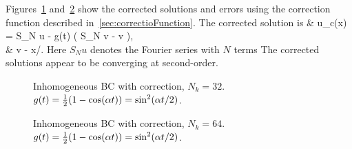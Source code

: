 Figures~\ref{fig:eveForcedBCCorrectedN32} and~\ref{fig:eveForcedBCCorrectedN64}
show the corrected solutions and errors using the correction function described in~\ref{sec:correctioFunction}.
The corrected solution is 
\ba
  & u_c(x) = S_N u - g(t) ( S_N v - v ), \\
  & v  - x/\pi .
\ea
Here $S_N u$ denotes the Fourier series with $N$ terms
The corrected solutions appear to be converging at second-order.


{
\newcommand{\width}{5.cm}
\begin{figure}[htb]
\begin{center}
\end{center}
\caption{Inhomogeneous BC with correction, $N_k=32$. $g(t)={1\over2}( 1 - \cos(\alpha t))  = \sin^2(\alpha t/2)$.
    }
\label{fig:eveForcedBCCorrectedN32}
\end{figure}
}

{
\newcommand{\width}{5.cm}
\begin{figure}[htb]
\begin{center}
\end{center}
\caption{Inhomogeneous BC with correction, $N_k=64$. $g(t)={1\over2}( 1 - \cos(\alpha t))  = \sin^2(\alpha t/2)$.
    }
\label{fig:eveForcedBCCorrectedN64}
\end{figure}
}

